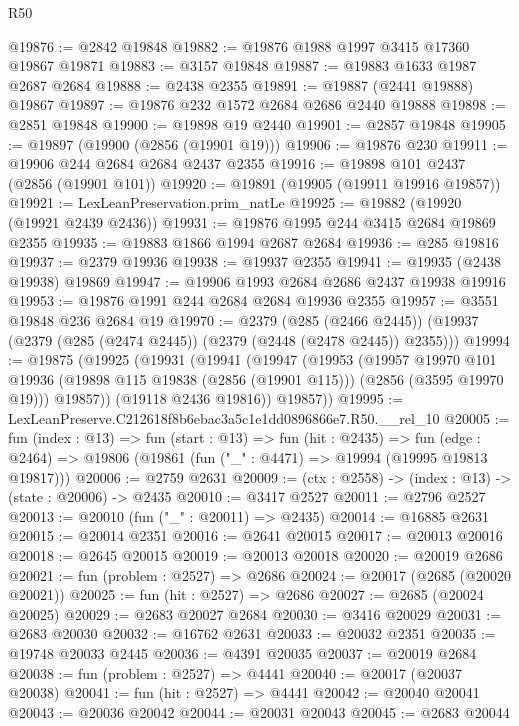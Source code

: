\begin{lexlean}{R50}
\begin{coremodule}
@19876 := @2842 @19848
@19882 := @19876 @1988 @1997 @3415 @17360 @19867 @19871
@19883 := @3157 @19848
@19887 := @19883 @1633 @1987 @2687 @2684
@19888 := @2438 @2355
@19891 := @19887 (@2441 @19888) @19867
@19897 := @19876 @232 @1572 @2684 @2686 @2440 @19888
@19898 := @2851 @19848
@19900 := @19898 @19 @2440
@19901 := @2857 @19848
@19905 := @19897 (@19900 (@2856 (@19901 @19)))
@19906 := @19876 @230
@19911 := @19906 @244 @2684 @2684 @2437 @2355
@19916 := @19898 @101 @2437 (@2856 (@19901 @101))
@19920 := @19891 (@19905 (@19911 @19916 @19857))
@19921 := LexLeanPreservation.prim_natLe
@19925 := @19882 (@19920 (@19921 @2439 @2436))
@19931 := @19876 @1995 @244 @3415 @2684 @19869 @2355
@19935 := @19883 @1866 @1994 @2687 @2684
@19936 := @285 @19816
@19937 := @2379 @19936
@19938 := @19937 @2355
@19941 := @19935 (@2438 @19938) @19869
@19947 := @19906 @1993 @2684 @2686 @2437 @19938 @19916
@19953 := @19876 @1991 @244 @2684 @2684 @19936 @2355
@19957 := @3551 @19848 @236 @2684 @19
@19970 := @2379
    (@285 (@2466 @2445))
    (@19937 (@2379 (@285 (@2474 @2445)) (@2379 (@2448 (@2478 @2445)) @2355)))
@19994 := @19875
    (@19925
      (@19931
        (@19941
          (@19947
            (@19953
              (@19957
                @19970
                @101
                @19936
                (@19898 @115 @19838 (@2856 (@19901 @115)))
                (@2856 (@3595 @19970 @19)))
              @19857))
          (@19118 @2436 @19816))
        @19857))
@19995 := LexLeanPreserve.C212618f8b6ebac3a5c1e1dd0896866e7.R50.__rel_10
@20005 := fun (index : @13) =>
  fun (start : @13) =>
  fun (hit : @2435) =>
  fun (edge : @2464) => @19806 (@19861 (fun ("_" : @4471) => @19994 (@19995 @19813 @19817)))
@20006 := @2759 @2631
@20009 := (ctx : @2558) -> (index : @13) -> (state : @20006) -> @2435
@20010 := @3417 @2527
@20011 := @2796 @2527
@20013 := @20010 (fun ("_" : @20011) => @2435)
@20014 := @16885 @2631
@20015 := @20014 @2351
@20016 := @2641 @20015
@20017 := @20013 @20016
@20018 := @2645 @20015
@20019 := @20013 @20018
@20020 := @20019 @2686
@20021 := fun (problem : @2527) => @2686
@20024 := @20017 (@2685 (@20020 @20021))
@20025 := fun (hit : @2527) => @2686
@20027 := @2685 (@20024 @20025)
@20029 := @2683 @20027 @2684
@20030 := @3416 @20029
@20031 := @2683 @20030
@20032 := @16762 @2631
@20033 := @20032 @2351
@20035 := @19748 @20033 @2445
@20036 := @4391 @20035
@20037 := @20019 @2684
@20038 := fun (problem : @2527) => @4441
@20040 := @20017 (@20037 @20038)
@20041 := fun (hit : @2527) => @4441
@20042 := @20040 @20041
@20043 := @20036 @20042
@20044 := @20031 @20043
@20045 := @2683 @20044

\end{coremodule}
\end{lexlean}
